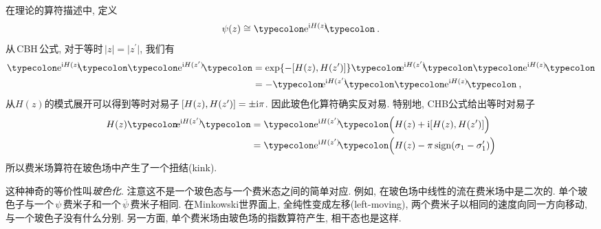 在理论的算符描述中, 定义
\begin{equation}
    \psi(z)\cong \typecolon \me^{\mi H(z)}\!\!\typecolon \:.\label{10.3.14}
\end{equation}
从\,CBH\,公式, 对于等时$\,\lvert z\rvert =\lvert z^{\prime}\rvert$, 我们有
\begin{align}
     \typecolon \me^{\mi H(z)}\!\!\typecolon  \typecolon \me^{\mi H(z^{\prime})}\!\typecolon 
     &=\exp\{-[H(z),H(z^{\prime})]\}\typecolon\! \me^{\mi H(z^{\prime})}\!\!\typecolon 
      \typecolon \me^{\mi H(z)}\!\typecolon \nonumber \\
      &=-\typecolon \!\me^{\mi H(z^{\prime})}\!\!\typecolon  \typecolon \me^{\mi H(z)}\!\typecolon \:,\label{10.3.15}
\end{align}
从$H(z)$的模式展开可以得到等时对易子$\,[H(z),H(z^{\prime})]=\pm\mathrm{i}\pi$. 因此玻色化算符确实反对易. 特别地, CHB公式给出等时对易子
\begin{align}
    H(z)\typecolon\!\me^{\mi H(z^{\prime})}\!\typecolon &=\typecolon\me^{\mi H(z^{\prime})}\!\typecolon 
    \Bigl(H(z)+\mi[H(z),H(z^{\prime})]\Bigr) \nonumber \\
    &=\typecolon\me^{\mi H(z^{\prime})}\!\typecolon \Bigl(H(z)- \pi\,\mathrm{sign}(\sigma_{1}-\sigma_{1}^{\prime})\Bigr)
\end{align}
所以费米场算符在玻色场中产生了一个扭结(kink).

这种神奇的等价性叫{\emph{玻色化}}. 注意这不是一个玻色态与一个费米态之间的简单对应. 例如, 在玻色场中线性的流在费米场中是二次的. 单个玻色子与一个$\,\psi\,$费米子和一个$\,\overline{\psi}\,$费米子相同. 在Minkowski世界面上, 全纯性变成左移(left-moving), 两个费米子以相同的速度向同一方向移动, 与一个玻色子没有什么分别. 另一方面, 单个费米场由玻色场的指数算符产生, 相干态也是这样.

